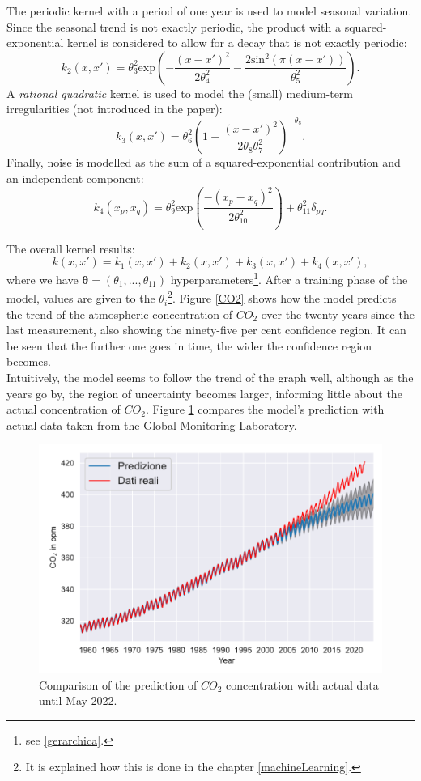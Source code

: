 The periodic kernel with a period of one year is used to model seasonal variation. Since the seasonal trend is not exactly periodic, the product with a squared-exponential kernel is considered to allow for a decay that is not exactly periodic: 
\[
k_2(x, x') = \theta^2_3 \text{exp}\left( - \frac{(x - x')^2}{2\theta^2_4} - \frac{2 \text{sin}^2(\pi(x - x'))}{\theta^2_5} \right).
\]
A \textit{rational quadratic} kernel is used to model the (small) medium-term irregularities (not introduced in the paper): 
\[
k_3(x, x') = \theta^2_6 \left( 1 + \frac{(x - x')^2}{2\theta_8\theta^2_7} \right)^{-\theta_8}.
\] 
Finally, noise is modelled as the sum of a squared-exponential contribution and an independent component:
\[
k_4(x_p, x_q) = \theta^2_9 \text{exp}\left( \frac{- (x_p - x_q)^2}{2\theta^2_{10}} \right) + \theta^2_{11} \delta_{pq}.
\]

The overall kernel results:
\[
k(x,x')=k_1(x,x')+k_2(x,x')+k_3(x,x')+k_4(x,x'),
\]
where we have $\bm{\theta}=(\theta_1,...,\theta_{11})$ hyperparameters\footnote{see \ref{gerarchica}.}. After a training phase of the model, values are given to the $\theta_i$\footnote{It is explained how this is done in the chapter \ref{machineLearning}.}. Figure \ref{CO2} shows how the model predicts the trend of the atmospheric concentration of $CO_2$ over the twenty years since the last measurement, also showing the ninety-five per cent confidence region. It can be seen that the further one goes in time, the wider the confidence region becomes.\\
Intuitively, the model seems to follow the trend of the graph well, although as the years go by, the region of uncertainty becomes larger, informing little about the actual concentration of $CO_2$. Figure \ref{CO2_comparison} compares the model's prediction with actual data taken from the \href{https://gml.noaa.gov/ccgg/trends/}{Global Monitoring Laboratory}.


\begin{figure}[h]
    \centering
    \includegraphics[width=1\textwidth]{images/Gaussian process/MaunaLoaPrediction.pdf}
    \caption{Comparison of the prediction of $CO_2$ concentration with actual data until May 2022.}
    \label{CO2_comparison}
\end{figure}

